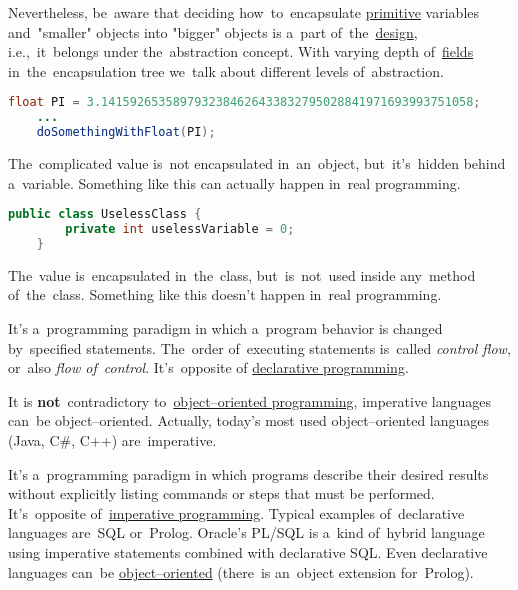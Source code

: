 Nevertheless, be~aware that deciding how~to~encapsulate \hyperref[javadatatypes]{primitive} variables and~"smaller" objects into "bigger" objects is a~part of~the~\hyperref[architecturedesign]{design}, i.e.,~it~belongs under the~abstraction concept. With varying depth of~\hyperref[variablefieldproperty]{fields} in~the~encapsulation tree we~talk about different levels of~abstraction.
\newpage

\begin{lstlisting}[language=Java]
    float PI = 3.1415926535897932384626433832795028841971693993751058;
    ...
    doSomethingWithFloat(PI);
\end{lstlisting}

\noindent The~complicated value is~not encapsulated in~an~object, but~it's~hidden behind a~variable. Something like this can actually happen in~real programming.

\begin{lstlisting}[language=Java]
    public class UselessClass {
        private int uselessVariable = 0;
    }
\end{lstlisting}

\noindent The~value is~encapsulated in~the~class, but~is~not~used inside any~method of~the~class. Something like this doesn't happen in~real programming.



\label{imperativeprogramming}
It's a~programming paradigm in which a~program behavior is changed by~specified statements. The~order of~executing statements is~called \textit{control flow}, or~also \textit{flow of~control}. It's~opposite of \hyperref[declarativeprogramming]{declarative programming}.

\warning It is \textbf{not}~contradictory to~\hyperref[objectorientedprogramming]{object--oriented programming}, imperative languages can~be object--oriented. Actually, today's most used object--oriented languages (Java, C\#, C++) are~imperative.

\label{declarativeprogramming}
It's a~programming paradigm in which programs describe their desired results without explicitly listing commands or steps that must be performed. It's~opposite of~\hyperref[imperativeprogramming]{imperative programming}. Typical examples of~declarative languages are~SQL or~Prolog. Oracle's PL/SQL is a~kind of~hybrid language using imperative statements combined with declarative SQL. Even declarative languages can~be \hyperref[objectorientedprogramming]{object--oriented} (there~is an~object extension for~Prolog).

